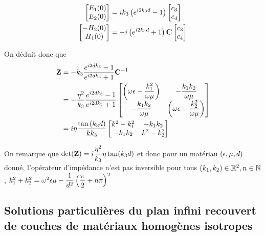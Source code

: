 \begin{align}
    \begin{bmatrix}
        E_1(0)\\
        E_2(0)\\
    \end{bmatrix}
    &=ik_3\left( e^{i2k_3 d} -1 \right)
    \begin{bmatrix}
        c_3 \\
        c_4
    \end{bmatrix} \\
    \begin{bmatrix}
        -H_2(0)\\
        H_1(0)\\
    \end{bmatrix}
    & = - i\left(e^{i2k_3 d} +1 \right)
    \mathbf{C}
    \begin{bmatrix}
    c_3 \\
    c_4
    \end{bmatrix}
\end{align}

On déduit donc que
\begin{align}
    \mathbf{Z} &=  - k_3 \dfrac{e^{i2dk_3} -1}{e^{i2dk_3} +1} \mathbf{C}^{-1} 
    \\
    &= -\dfrac{\eta^2}{k_3} \dfrac{e^{i2dk_3} -1}{e^{i2dk_3} +1}
        \begin{bmatrix}
           \left(\omega\epsilon-\dfrac{k_1^2}{\omega\mu}\right)  & -\dfrac{k_1k_2}{\omega\mu}\\
            -\dfrac{k_1k_2}{\omega\mu} &  \left(\omega\epsilon-\dfrac{k_2^2}{\omega\mu}\right)
        \end{bmatrix}
    \\
    &= i\eta\dfrac{\tan\left(k_3d\right)}{kk_3}
        \begin{bmatrix}
           k^2-k_1^2  & -k_1k_2\\
            -k_1k_2 & k^2-k_2^2\\
        \end{bmatrix}
\end{align}

On remarque que $\det(\mathbf{Z}) = i\dfrac{\eta^2}{k_3}\eta\tan(k_3d)$ et donc pour un matériau $(\epsilon,\mu,d)$ donné, l'opérateur d'impédance n'est pas inversible pour tous  $(k_1,k_2) \in \mathbb R^2, n \in \mathbb N$, $k_1^2+k_2^2 =  \omega^2\epsilon\mu - \dfrac{1}{d^2}\left(\dfrac{\pi}{2} + n\pi\right)^2$

\subsection{Solutions particulières du plan infini recouvert de couches de matériaux homogènes isotropes}

